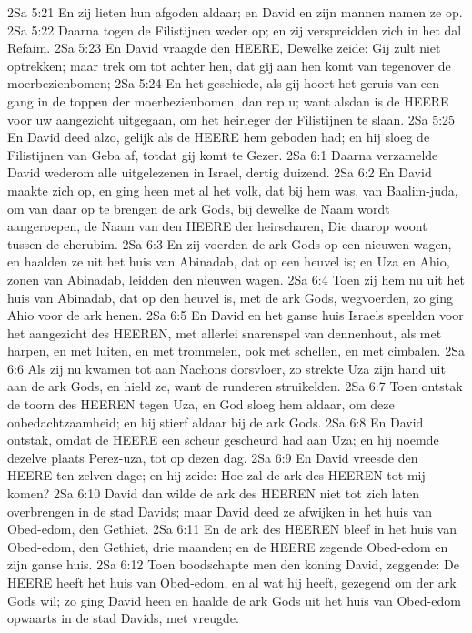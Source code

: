 2Sa 5:21  En zij lieten hun afgoden aldaar; en David en zijn mannen namen ze op.
2Sa 5:22  Daarna togen de Filistijnen weder op; en zij verspreidden zich in het dal Refaim.
2Sa 5:23  En David vraagde den HEERE, Dewelke zeide: Gij zult niet optrekken; maar trek om tot achter hen, dat gij aan hen komt van tegenover de moerbezienbomen;
2Sa 5:24  En het geschiede, als gij hoort het geruis van een gang in de toppen der moerbezienbomen, dan rep u; want alsdan is de HEERE voor uw aangezicht uitgegaan, om het heirleger der Filistijnen te slaan.
2Sa 5:25  En David deed alzo, gelijk als de HEERE hem geboden had; en hij sloeg de Filistijnen van Geba af, totdat gij komt te Gezer.
2Sa 6:1  Daarna verzamelde David wederom alle uitgelezenen in Israel, dertig duizend.
2Sa 6:2  En David maakte zich op, en ging heen met al het volk, dat bij hem was, van Baalim-juda, om van daar op te brengen de ark Gods, bij dewelke de Naam wordt aangeroepen, de Naam van den HEERE der heirscharen, Die daarop woont tussen de cherubim.
2Sa 6:3  En zij voerden de ark Gods op een nieuwen wagen, en haalden ze uit het huis van Abinadab, dat op een heuvel is; en Uza en Ahio, zonen van Abinadab, leidden den nieuwen wagen.
2Sa 6:4  Toen zij hem nu uit het huis van Abinadab, dat op den heuvel is, met de ark Gods, wegvoerden, zo ging Ahio voor de ark henen.
2Sa 6:5  En David en het ganse huis Israels speelden voor het aangezicht des HEEREN, met allerlei snarenspel van dennenhout, als met harpen, en met luiten, en met trommelen, ook met schellen, en met cimbalen.
2Sa 6:6  Als zij nu kwamen tot aan Nachons dorsvloer, zo strekte Uza zijn hand uit aan de ark Gods, en hield ze, want de runderen struikelden.
2Sa 6:7  Toen ontstak de toorn des HEEREN tegen Uza, en God sloeg hem aldaar, om deze onbedachtzaamheid; en hij stierf aldaar bij de ark Gods.
2Sa 6:8  En David ontstak, omdat de HEERE een scheur gescheurd had aan Uza; en hij noemde dezelve plaats Perez-uza, tot op dezen dag.
2Sa 6:9  En David vreesde den HEERE ten zelven dage; en hij zeide: Hoe zal de ark des HEEREN tot mij komen?
2Sa 6:10  David dan wilde de ark des HEEREN niet tot zich laten overbrengen in de stad Davids; maar David deed ze afwijken in het huis van Obed-edom, den Gethiet.
2Sa 6:11  En de ark des HEEREN bleef in het huis van Obed-edom, den Gethiet, drie maanden; en de HEERE zegende Obed-edom en zijn ganse huis.
2Sa 6:12  Toen boodschapte men den koning David, zeggende: De HEERE heeft het huis van Obed-edom, en al wat hij heeft, gezegend om der ark Gods wil; zo ging David heen en haalde de ark Gods uit het huis van Obed-edom opwaarts in de stad Davids, met vreugde.
